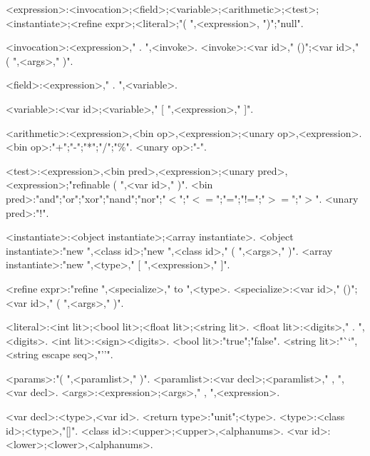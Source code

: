 \begin{grammar}
<expression>:<invocation>;<field>;<variable>;<arithmetic>;<test>;<instantiate>;<refine expr>;<literal>;"( ",<expression>, ")";"null".

<invocation>:<expression>," . ",<invoke>.
<invoke>:<var id>," ()";<var id>," ( ",<args>," )".

<field>:<expression>," . ",<variable>.

<variable>:<var id>;<variable>," [ ",<expression>," ]".

<arithmetic>:<expression>,<bin op>,<expression>;<unary op>,<expression>.
<bin op>:"+";"-";"*";"/";"\%".
<unary op>:"-".

<test>:<expression>,<bin pred>,<expression>;<unary pred>,<expression>;"refinable ( ",<var id>," )".
<bin pred>:"and";"or";"xor";"nand";"nor";"$<$";"$<=$";"=";"!=";"$>=$";"$>$".
<unary pred>:"!".

<instantiate>:<object instantiate>;<array instantiate>.
<object instantiate>:"new ",<class id>;"new ",<class id>," ( ",<args>," )".
<array instantiate>:"new ",<type>," [ ",<expression>," ]".

<refine expr>:"refine ",<specialize>," to ",<type>.
<specialize>:<var id>," ()";<var id>," ( ",<args>," )".

<literal>:<int lit>;<bool lit>;<float lit>;<string lit>.
<float lit>:<digits>," . ",<digits>.
<int lit>:<sign><digits>.
<bool lit>:"true";"false".
<string lit>:"``",<string escape seq>,"''".

<params>:"( ",<paramlist>," )".
<paramlist>:<var decl>;<paramlist>," , ",<var decl>.
<args>:<expression>;<args>," , ",<expression>.

<var decl>:<type>,<var id>.
<return type>:"unit";<type>.
<type>:<class id>;<type>,"[]".
<class id>:<upper>;<upper>,<alphanums>.
<var id>:<lower>;<lower>,<alphanums>.

\end{grammar}

